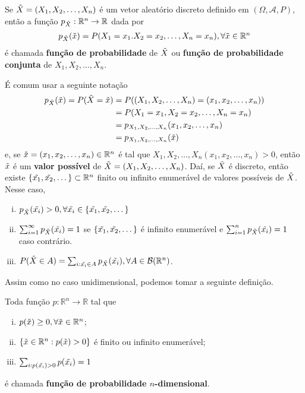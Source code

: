 \documentclass[../Notas.tex]{subfiles}
\begin{document}
\begin{definition}
Se $\Tilde{X} = (X_1, X_2, \dots, X_n)$ é um vetor aleatório discreto definido em $(\Omega, \mathcal{A}, P)$, então a função $p_{\Tilde{X}}:\mathbb{R}^n\to\mathbb{R}$ dada por
\begin{align*}
    p_{\Tilde{X}}(\Tilde{x}) = P(X_1=x_1. X_2=x_2, \dots, X_n=x_n), \forall\Tilde{x}\in\mathbb{R}^n
\end{align*}
é chamada \textbf{função de probabilidade} de $\Tilde{X}$ ou \textbf{função de probabilidade conjunta} de $X_1, X_2, \dots, X_n$.
\end{definition}

\begin{remark}
É comum usar a seguinte notação
\begin{align*}
    p_{\Tilde{X}}(\Tilde{x}) = P(\Tilde{X} = \Tilde{x}) &= P((X_1, X_2, \dots, X_n) = (x_1, x_2, \dots, x_n)) \\
    &= P(X_1=x_1, X_2=x_2, \dots, X_n=x_n) \\
    &= p_{X_1, X_2, \dots, X_n}(x_1, x_2, \dots, x_n) \\ 
    &= p_{X_1, X_2, \dots, X_n}(\Tilde{x})
\end{align*}
e, se $\Tilde{x} = (x_1, x_2, \dots, x_n)\in\mathbb{R}^n$ é tal que $\displaystyle{ X_1, X_2, \dots, X_n }(x_1, x_2, \dots, x_n) > 0$, então $\Tilde{x}$ é um \textbf{valor possível} de $\Tilde{X} = (X_1, X_2, \dots, X_n)$. Daí, se $\Tilde{X}$ é discreto, então existe $\{ \Tilde{x_1}, \Tilde{x_2}, \dots \}\subset\mathbb{R}^n$ finito ou infinito enumerável de valores possíveis de $\Tilde{X}$. Nesse caso,
\begin{enumerate}[(i)]
    \item $p_{\Tilde{X}}(\Tilde{x_i}) > 0, \forall\Tilde{x_i}\in\{\Tilde{x_1}, \Tilde{x_2}, \dots\}$
    \item $\displaystyle{ \sum_{i=1}^{\infty}p_{\Tilde{X}}(\Tilde{x_i}) = 1 }$ se $\{ \Tilde{x_1}, \Tilde{x_2}, \dots \}$ é infinito enumerável e $\displaystyle{ \sum_{i=1}^{n}p_{\Tilde{X}}(\Tilde{x_i}) = 1 }$ caso contrário.
    \item $\displaystyle{P(\Tilde{X}\in A) = \sum_{ i:\Tilde{x_i}\in A }p_{\Tilde{X}}(\Tilde{x_i}), \forall A\in\mathcal{B}(\mathbb{R}^n)}$.
\end{enumerate}
\end{remark}
Assim como no caso unidimensional, podemos tomar a seguinte definição.
\begin{definition}
Toda função $p:\mathbb{R}^n\to\mathbb{R}$ tal que
\begin{enumerate}[(i)]
    \item $p(\Tilde{x}) \geq 0, \forall \Tilde{x}\in\mathbb{R}^n$;
    \item $\{ \Tilde{x}\in\mathbb{R}^n : p(\Tilde{x}) > 0 \}$ é finito ou infinito enumerável;
    \item $\displaystyle{ \sum_{i : p(\Tilde{x_i}) > 0} p(\Tilde{x_i}) = 1 }$
\end{enumerate}
é chamada \textbf{função de probabilidade $n$-dimensional}.
\end{definition}
\end{document}
